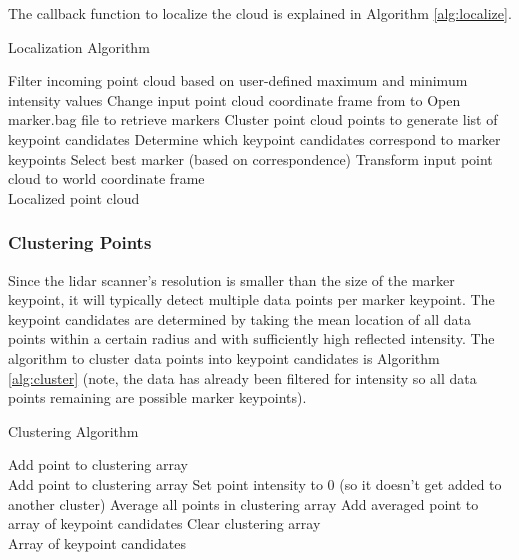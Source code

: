 The callback function to localize the cloud is explained in Algorithm \ref{alg:localize}.
\begin{algorithm}[H]
\caption{Localization Algorithm}
\label{alg:localize}
\begin{algorithmic}[1]
\begin{raggedright}
\State Filter incoming point cloud based on user-defined maximum and minimum intensity values
\State Change input point cloud coordinate frame from  to 
\Else
\State Open marker.bag file to retrieve markers
\State Cluster point cloud points to generate list of keypoint candidates
\State Determine which keypoint candidates correspond to marker keypoints
\State Select best marker (based on correspondence)
\State Transform input point cloud to world coordinate frame \EndIf
\EndFunction\\
\Return Localized point cloud
\end{raggedright}
\end{algorithmic}
\end{algorithm}

\subsubsection{Clustering Points}
Since the \acrshort{lidar} scanner's resolution is smaller than the size of the marker keypoint, it will typically detect multiple data points per marker keypoint. The keypoint candidates are determined by taking the mean location of all data points within a certain radius and with sufficiently high reflected intensity. The algorithm to cluster data points into keypoint candidates is Algorithm \ref{alg:cluster} (note, the data has already been filtered for intensity so all data points remaining are possible marker keypoints).

\begin{algorithm}[H]
\caption{Clustering Algorithm}
\label{alg:cluster}
\begin{algorithmic}[1]
\begin{raggedright}
\State Add point to clustering array
\\
\State Add point to clustering array
\State Set point intensity to 0 (so it doesn't get added to another cluster)
\EndIf
\EndFor
\State Average all points in clustering array
\State Add averaged point to array of keypoint candidates
\State Clear clustering array
\EndIf
\EndFor
\EndFunction\\
\Return Array of keypoint candidates
\end{raggedright}
\end{algorithmic}
\end{algorithm}
